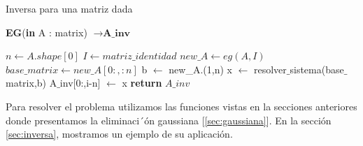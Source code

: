\begin{algorithm}[H]
\caption{Inversa para una matriz dada}
\begin{algorithmic}
\State \textbf{EG}(\textbf{in} A : matrix) $\to \textbf{A\_inv}$
 
 \State $n \gets A.shape[0]$
 \State $I \gets matriz\_identidad$
 \State $new\_A \gets eg(A,I)$
 \State $base\_matrix \gets new\_A[0:,:n]$
        \State  b $\gets$ new\_A.(1,n)
        \State x $\gets$ resolver$\_$sistema(base$\_$matrix,b)
        \State A$\_$inv[0:,i-n] $\gets$ x
 \EndFor
 \State \textbf{return} $A\_inv$

\end{algorithmic}
\label{alg:inversa}
\end{algorithm}

Para resolver el problema utilizamos las funciones vistas en la secciones anteriores donde presentamos la eliminaci´ón gaussiana [\ref{sec:gaussiana}]. En la sección \ref{sec:inversa}, mostramos un ejemplo de su aplicación.
